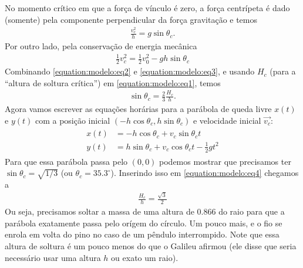 \documentclass[letterpaper,10pt,english]{jupyterBook}
\begin{document}
\sphinxAtStartPar
No momento crítico em que a força de vínculo é zero, a força centrípeta é dado (somente) pela componente perpendicular da força gravitação e temos
\begin{equation}\label{equation:modelo:eq2}
\begin{split}
\frac{v_{c}^{2}}{h}  = g \sin{\theta_c}.
\end{split}
\end{equation}
\sphinxAtStartPar
Por outro lado, pela conservação de energia mecânica
\begin{equation}\label{equation:modelo:eq3}
\begin{split}
  \frac{1}{2}v_{c}^2 = \frac{1}{2}v_{0}^2 -gh\sin{\theta_c}
\end{split}
\end{equation}
\sphinxAtStartPar
Combinando \eqref{equation:modelo:eq2} e \eqref{equation:modelo:eq3}, e usando \(H_c\) (para a “altura de soltura crítica”) em \eqref{equation:modelo:eq1}, temos
\begin{equation}\label{equation:modelo:eq4}
\begin{split}
  \sin{\theta_c} = \frac{2}{3}\frac{H_c}{h}.
\end{split}
\end{equation}
\sphinxAtStartPar
Agora vamos escrever as equações horárias para a parábola de queda livre \(x(t)\) e \(y(t)\) com a posição inicial \((-h\cos{\theta_c},h\sin{\theta_c})\) e velocidade inicial \(\vec{v_c}\):
\begin{equation*}
\begin{split}
\begin{aligned}
x(t) & = -h\cos{\theta_c} + v_c\sin{\theta_c}t  \\
y(t) & = h\sin{\theta_c} + v_c\cos{\theta_c}t - \frac{1}{2}gt^2
\end{aligned}
\end{split}
\end{equation*}
\sphinxAtStartPar
Para que essa parábola passa pelo \((0,0)\) podemos mostrar que precisamos ter \(\sin{\theta_c} = \sqrt{1/3}\) (ou \(\theta_c = 35.3^{\circ}\)). Inserindo isso em \eqref{equation:modelo:eq4} chegamos a
\begin{equation*}
\begin{split}
  \boxed{\frac{H_c}{h} = \frac{\sqrt{3}}{2}}
\end{split}
\end{equation*}
\sphinxAtStartPar
Ou seja, precisamos soltar a massa de uma altura de \(0.866\) do raio para que a parábola exatamente passa pelo orígem do círculo. Um pouco mais, e o fio se enrola em volta do pino no caso de um pêndulo interrompido. Note que essa altura de soltura é um pouco menos do que o Galileu afirmou (ele disse que seria necessário usar uma altura \(h\) ou exato um raio).
\end{document}
